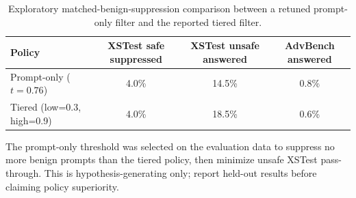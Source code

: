 \begin{table}[t]
\centering
\small
\caption{Exploratory matched-benign-suppression comparison between a retuned prompt-only filter and the reported tiered filter.}
\label{tab:jev_matched}
\begin{tabular}{lccc}
\toprule
Policy & XSTest safe suppressed & XSTest unsafe answered & AdvBench answered \\
\midrule
Prompt-only ($t=0.76$) & 4.0\% & 14.5\% & 0.8\% \\
Tiered (low=0.3, high=0.9) & 4.0\% & 18.5\% & 0.6\% \\
\bottomrule
\end{tabular}
\par\vspace{2pt}
\begin{minipage}{0.97\linewidth}
\footnotesize The prompt-only threshold was selected on the evaluation data to suppress no more benign prompts than the tiered policy, then minimize unsafe XSTest pass-through. This is hypothesis-generating only; report held-out results before claiming policy superiority.
\end{minipage}
\end{table}
